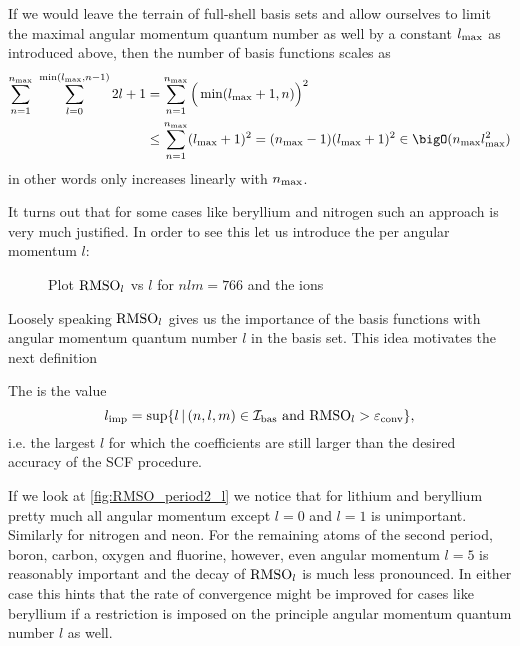 





If we would leave the terrain of full-shell basis sets
and allow ourselves to limit the maximal angular momentum quantum
number as well by a constant $l_\text{max}$ as introduced above,
then the number of basis functions scales as
\begin{align*}
\sum_{n=1}^{\nmax} \ \sum_{l=0}^{\min(\lmax, n-1)} 2l + 1
	&= \sum_{n=1}^{\nmax} \Big( \min(\lmax+1, n) \Big)^2 \\
	&\le \sum_{n=1}^{\nmax} (\lmax+1)^2 = (\nmax-1) (\lmax+1)^2
	\in \bigO(\nmax \lmax^2)
\end{align*}
in other words only increases linearly with $n_\text{max}$.

It turns out that for some cases like beryllium and nitrogen
such an approach is very much justified.
In order to see this let us introduce the
per angular momentum $l$:

\begin{figure}
	\centering
	\caption{Plot $\text{RMSO}_l$ vs $l$ for $nlm = 766$ and the ions}
	\label{fig:RMSOl_ions}
\end{figure}

Loosely speaking $\text{RMSO}_l$ gives us the importance of the basis functions
with angular momentum quantum number $l$ in the \CS basis set.
This idea motivates the next definition

\newcommand{\limp}{l_\text{imp}}
\begin{defn}
	The  is the value
	\[ \limp = \sup \{ l \, | \, (n,l,m) \in \Ibas \ \text{and} \ \RMSOl > \epsilonconv \}, \]
	i.e. the largest $l$ for which the coefficients are still larger than the
	desired accuracy of the SCF procedure.
\end{defn}

If we look at \vref{fig:RMSO_period2_l} we notice
that for lithium and beryllium pretty much all angular momentum
except $l = 0$ and $l = 1$ is unimportant.
Similarly for nitrogen and neon.
For the remaining atoms of the second period,
boron, carbon, oxygen and fluorine, however,
even angular momentum $l=5$ is reasonably important and the
decay of $\text{RMSO}_l$ is much less pronounced.
In either case this hints that the rate of convergence might
be improved for cases like beryllium
if a restriction is imposed on the principle angular momentum
quantum number $l$ as well.

